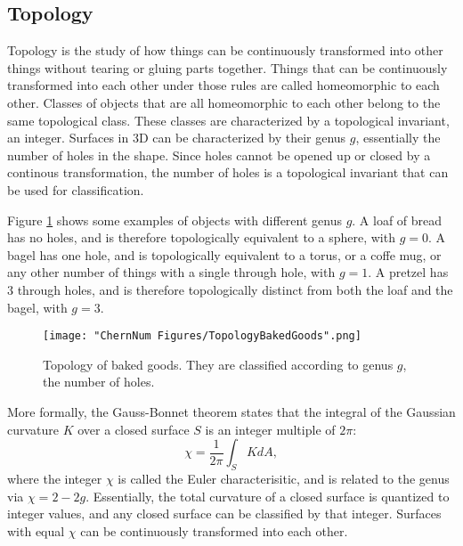 \subsection{Topology}
Topology is the study of how things can be continuously transformed into other things without tearing or gluing parts together. Things that can be continuously transformed into each other under those rules are called homeomorphic to each other. Classes of objects that are all homeomorphic to each other belong to the same topological class. These classes are characterized by a topological invariant, an integer. Surfaces in 3D can be characterized by their genus $g$, essentially the number of holes in the shape. Since holes cannot be opened up or closed by a continous transformation, the number of holes is a topological invariant that can be used for classification. 

Figure \ref{fig:bakedGoods} shows some examples of objects with different genus $g$. A loaf of bread has no holes, and is therefore topologically equivalent to a sphere, with $g=0$. A bagel has one hole, and is topologically equivalent to a torus, or a coffe mug, or any other number of things with a single through hole, with $g=1$. A pretzel has $3$ through holes, and is therefore topologically distinct from both the loaf and the bagel, with $g=3$. 
\begin{figure}
	\texttt{[image: "ChernNum Figures/TopologyBakedGoods".png]}
\label{fig:bakedGoods}
\caption{Topology of baked goods. They are classified according to genus $g$, the number of holes.}
\end{figure}

More formally, the Gauss-Bonnet theorem states that the integral of the Gaussian curvature $K$ over a closed surface $S$ is an integer multiple of $2\pi$:
\begin{equation}
\chi = \frac{1}{2\pi}\int_S K dA,
\label{eqn:GaussBonnet}
\end{equation}
where the integer $\chi$ is called the Euler characterisitic, and is related to the genus via $\chi = 2 - 2g$. Essentially, the total curvature of a closed surface is quantized to integer values, and any closed surface can be classified by that integer. Surfaces with equal $\chi$ can be continuously transformed into each other.

